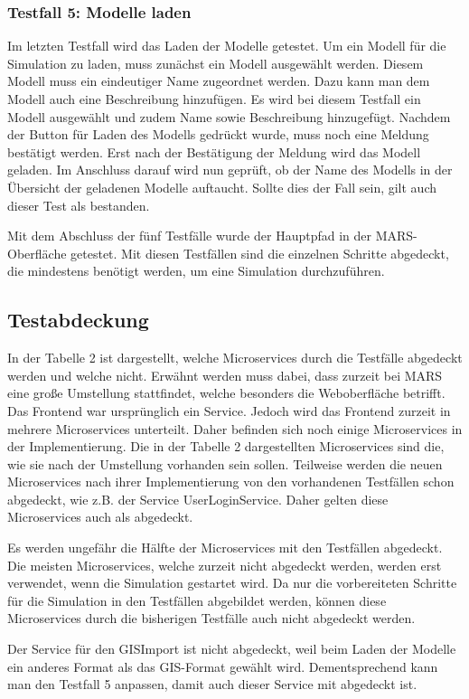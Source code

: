\documentclass{llncs}
\begin{document}
\subsubsection{Testfall 5: Modelle laden}
Im letzten Testfall wird das Laden der Modelle getestet. Um ein Modell für die Simulation zu laden, muss zunächst ein Modell ausgewählt werden. Diesem Modell muss ein eindeutiger Name zugeordnet werden. Dazu kann man dem Modell auch eine Beschreibung hinzufügen.
Es wird bei diesem Testfall ein Modell ausgewählt und zudem Name sowie Beschreibung hinzugefügt. Nachdem der Button für Laden des Modells gedrückt wurde, muss noch eine Meldung bestätigt werden. Erst nach der Bestätigung der Meldung wird das Modell geladen. Im Anschluss darauf wird nun geprüft, ob der Name des Modells in der Übersicht der geladenen Modelle auftaucht. Sollte dies der Fall sein, gilt auch dieser Test als bestanden.

Mit dem Abschluss der fünf Testfälle wurde der Hauptpfad in der MARS-Oberfläche getestet. Mit diesen Testfällen sind die einzelnen Schritte abgedeckt, die mindestens benötigt werden, um eine Simulation durchzuführen.

\subsection{Testabdeckung}
In der Tabelle 2 ist dargestellt, welche Microservices durch die Testfälle abgedeckt werden und welche nicht. Erwähnt werden muss dabei, dass zurzeit bei MARS eine große Umstellung stattfindet, welche besonders die Weboberfläche betrifft. Das Frontend war ursprünglich ein Service. Jedoch wird das Frontend zurzeit in mehrere Microservices unterteilt. Daher befinden sich noch einige Microservices in der Implementierung. Die in der Tabelle 2 dargestellten Microservices sind die, wie sie nach der Umstellung vorhanden sein sollen. Teilweise werden die neuen Microservices nach ihrer Implementierung von den vorhandenen Testfällen schon abgedeckt, wie z.B. der Service UserLoginService. Daher gelten diese Microservices auch als abgedeckt.

Es werden ungefähr die Hälfte der Microservices mit den Testfällen abgedeckt. Die meisten Microservices, welche zurzeit nicht abgedeckt werden, werden erst verwendet, wenn die Simulation gestartet wird. Da nur die vorbereiteten Schritte für die Simulation in den Testfällen abgebildet werden, können diese Microservices durch die bisherigen Testfälle auch nicht abgedeckt werden.

Der Service für den GISImport ist nicht abgedeckt, weil beim Laden der Modelle ein anderes Format als das GIS-Format gewählt wird. Dementsprechend kann man den Testfall 5 anpassen, damit auch dieser Service mit abgedeckt ist.
\end{document}
